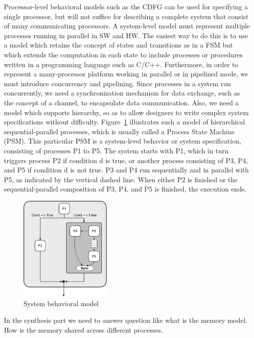 Processor-level behavioral models such as the CDFG can be used for specifying a single processor, but will not suffice for describing a complete system that consist of many communicating processors.
A system-level model must represent multiple processes running in parallel in SW and HW.
The easiest way to do this is to use a model which retains the concept of states and transitions as in a FSM but which extends the computation in each state to include processes or procedures written in a programming language such as C/C++.
Furthermore, in order to represent a many-processor platform working in parallel or in pipelined mode, we must introduce concurrency and pipelining.
Since processes in a system run concurrently, we need a synchronization mechanism for data exchange, such as the concept of a channel, to encapsulate data communication.
Also, we need a model which supports hierarchy, so as to allow designers to write complex system specifications without difficulty.
Figure~\ref{fig:task_graph} illustrates such a model of hierarchical sequential-parallel processes, which is
usually called a Process State Machine (PSM).
This particular PSM is a system-level behavior or system specification, consisting of processes P1 to P5.
The
system starts with P1, which in turn triggers process P2 if condition d is true, or
another process consisting of P3, P4, and P5 if condition d is not true. P3 and
P4 run sequentially and in parallel with P5, as indicated by the vertical dashed
line. When either P2 is finished or the sequential-parallel composition of P3,
P4, and P5 is finished, the execution ends.

\begin{figure}[h]
    \centering
    \includegraphics[width=0.4\textwidth]{figures/Introduction/Task_Graph.pdf}
    \caption{System behavioral model}
    \label{fig:task_graph}
\end{figure}


In the synthesis part we need to answer question like what is the memory model. How is the memory shared across different processes.



